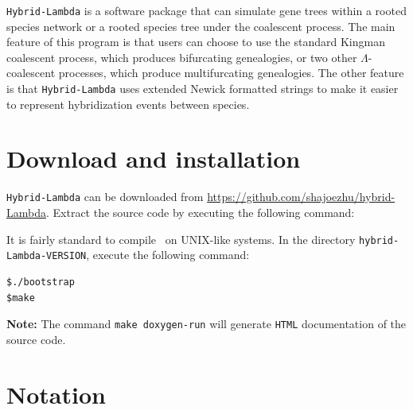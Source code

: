 



{\tt Hybrid-Lambda} is a software package that can simulate gene trees within a rooted species network or a rooted species tree under the coalescent process. The main feature of this program is that users can choose to use the standard Kingman coalescent process, which produces bifurcating genealogies, or two other $\Lambda$-coalescent processes, which produce multifurcating genealogies. The other feature is that {\tt Hybrid-Lambda} uses extended Newick formatted strings to make it easier to represent hybridization events between species.

\vspace{1.5cm}

\begin{center}
%

\end{center}

\vspace{1cm}


\section{Download and installation}
{\tt Hybrid-Lambda} can be downloaded from \url{https://github.com/shajoezhu/hybrid-Lambda}. 
Extract the source code by executing the following command:

It is fairly standard to compile \hs~on UNIX-like systems. In the directory {\tt hybrid-Lambda-VERSION}, execute the following command:
\begin{verbatim}
$./bootstrap
$make
\end{verbatim}

{\bf Note:} The command {\tt make doxygen-run} will generate {\tt HTML} documentation of the source code.

\section{Notation}
